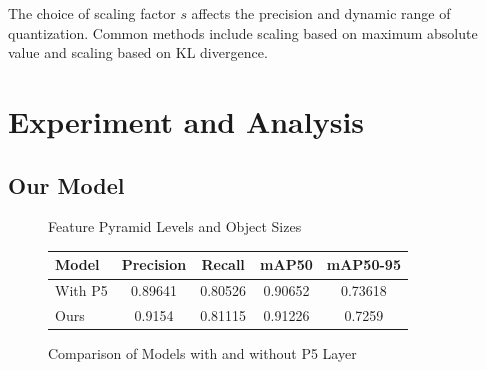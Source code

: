\documentclass[10pt]{article}
\begin{document}
   The choice of scaling factor $s$ affects the precision and dynamic range of quantization. Common methods include scaling based on maximum absolute value and scaling based on KL divergence\cite{nowak2018relaxation}.
    

\section{Experiment and Analysis}
\subsection{Our Model}

\begin{figure}[H]
    \centering
    \begin{minipage}{0.45\textwidth}
        \centering
        \caption{Feature Pyramid Levels and Object Sizes}
        \label{fig:feature_pyramid}
    \end{minipage}
    \hspace{0.01\textwidth}
    \begin{minipage}{0.40\textwidth}
        \centering
        \caption{Comparison of Models with and without P5 Layer}
        \label{tab:p5_comparison}
        \begin{tabular}{lcccc}
        \toprule
        Model         & Precision & Recall & mAP50 & mAP50-95 \\ \midrule
        With P5       & 0.89641          & 0.80526       & 0.90652      & 0.73618         \\
        Ours & 0.9154           & 0.81115      & 0.91226     & 0.7259        \\ \bottomrule
        \end{tabular}
    \end{minipage}
\end{figure}
\end{document}
